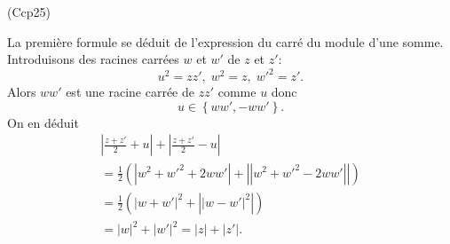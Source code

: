 \begin{tiny} (Ccp25) \end{tiny} La première formule se déduit de l'expression du carré du module d'une somme.\newline
Introduisons des racines carrées $w$ et $w'$ de $z$ et $z'$:
\[
 u^2 = zz', \; w^2 = z, \; w'^2 = z'.
\]
Alors $ww'$ est une racine carrée de $zz'$ comme $u$ donc
\[
 u \in \left\lbrace ww', -ww' \right\rbrace. 
\]
On en déduit 
\begin{multline*}
 \left|\frac{z + z'}{2} + u\right| + \left|\frac{z + z'}{2} - u\right| \\
 =
 \frac{1}{2}\left( \left|w^2 + w'^2 + 2ww'\right| + \left|\left|w^2 + w'^2 - 2ww'\right|\right|\right)  \\
 = \frac{1}{2}\left( \left|w + w'\right|^2 + \left|\left|w - w'\right|^2\right|\right)  \\
 = |w|^2 + |w'|^2 = |z| + |z'|.
\end{multline*}
